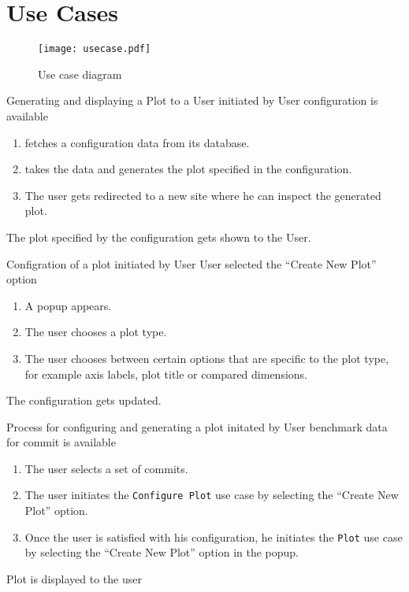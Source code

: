 \section{Use Cases}

\begin{figure}[H]
    \texttt{[image: usecase.pdf]}
    \caption{Use case diagram}
    \label{fig:usecase}
\end{figure}

{Generating and displaying a Plot to a User}
{initiated by User}
{\gls{configuration} is available}
{\begin{enumerate}
    \item \parkview{} fetches a \gls{configuration} data from its database.
    \item \parkview{} takes the data and generates the plot specified in the \gls{configuration}.
    \item The user gets redirected to a new site where he can inspect the generated plot.
\end{enumerate}}
{The plot specified by the \gls{configuration} gets shown to the User.}

\bigskip

{Configration of a \gls{plot}}
{initiated by User}
{User selected the \enquote{Create New Plot} option}
{\begin{enumerate}
    \item A popup appears.
    \item The user chooses a plot type.
    \item The user chooses between certain options that are specific to the plot type, for example axis labels, plot title or compared dimensions.
\end{enumerate}}
{The \gls{configuration} gets updated.}

\bigskip

{Process for configuring and generating a plot}
{initated by User}
{benchmark data for commit is available}
{\begin{enumerate}
    \item The user selects a set of commits.
    \item The user initiates the \texttt{Configure Plot} use case by selecting the \enquote{Create New Plot} option.
    \item Once the user is satisfied with his \gls{configuration}, he initiates the \texttt{Plot} use case by selecting the \enquote{Create New Plot} option in the popup.
\end{enumerate}}
{Plot is displayed to the user}

